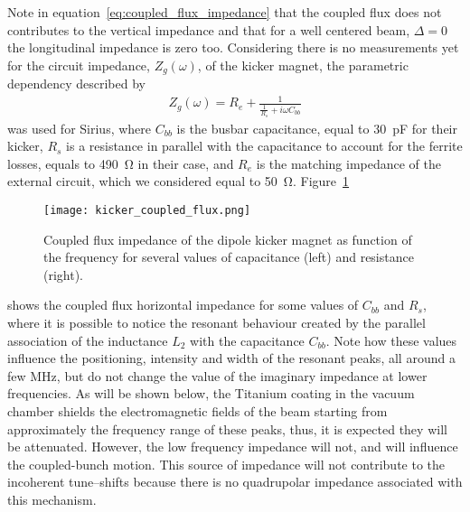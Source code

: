     Note in equation~\ref{eq:coupled_flux_impedance} that the coupled flux does not contributes to the vertical impedance and that for a well centered beam, $\Delta=0$ the longitudinal impedance is zero too. Considering there is no measurements yet for the circuit impedance, $Z_g(\omega)$, of the kicker magnet, the parametric dependency described by~
    \begin{align}
        Z_g(\omega) = R_e + \frac{1}{\frac{1}{R_s}+i\omega C_{bb}}
    \end{align}
    was used for Sirius, where $C_{bb}$ is the busbar capacitance, equal to \SI{30}{\pico\farad} for their kicker, $R_s$ is a resistance in parallel with the capacitance to account for the ferrite losses, equals to \SI{490}{\ohm} in their case, and $R_e$ is the matching impedance of the external circuit, which we considered equal to \SI{50}{\ohm}. Figure~\ref{fig:coupled_flux_impedance}
    \begin{figure}[b]
        \centering
        \texttt{[image: kicker\_coupled\_flux.png]}
        \caption{Coupled flux impedance of the dipole kicker magnet as function of the frequency for several values of capacitance (left) and resistance (right).}
        \label{fig:coupled_flux_impedance}
    \end{figure}
    shows the coupled flux horizontal impedance for some values of $C_{bb}$ and $R_s$, where it is possible to notice the resonant behaviour created by the parallel association of the inductance $L_2$ with the capacitance $C_{bb}$. Note how these values influence the positioning, intensity and width of the resonant peaks, all around a few \si{\mega\hertz}, but do not change the value of the imaginary impedance at lower frequencies. As will be shown below, the Titanium coating in the vacuum chamber shields the electromagnetic fields of the beam starting from approximately the frequency range of these peaks, thus, it is expected they will be attenuated. However, the low frequency impedance will not, and will influence the coupled-bunch motion. This source of impedance will not contribute to the incoherent tune--shifts because there is no quadrupolar impedance associated with this mechanism.

